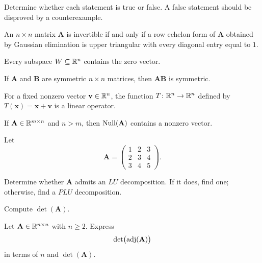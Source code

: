 \documentclass[11pt,oneside]{article}
\begin{document}
\begin{problem}
Determine whether each statement is true or false. A false statement should be disproved by a counterexample.
\begin{problemchoices}
\item An $n\times n$ matrix $\mathbf A$ is invertible if and only if a row echelon form of $\mathbf A$ obtained by Gaussian elimination is upper triangular with every diagonal entry equal to $1$.
\item Every subspace $W\subseteq\mathbb{R}^n$ contains the zero vector.
\item If $\mathbf A$ and $\mathbf B$ are symmetric $n\times n$ matrices, then $\mathbf A\mathbf B$ is symmetric.
\item For a fixed nonzero vector $\mathbf v\in\mathbb{R}^n$, the function $T\colon\mathbb{R}^n\to\mathbb{R}^n$ defined by $T(\mathbf x)=\mathbf x+\mathbf v$ is a linear operator.
\item If $\mathbf A\in\mathbb{R}^{m\times n}$ and $n>m$, then $\operatorname{Null}(\mathbf A)$ contains a nonzero vector.
\end{problemchoices}
\end{problem}

\begin{problem}
Let
\[
\mathbf A=
\begin{pmatrix}
1&2&3\\
2&3&4\\
3&4&5
\end{pmatrix}.
\]
\begin{problemsubparts}
\item Determine whether $\mathbf A$ admits an $LU$ decomposition. If it does, find one; otherwise, find a $PLU$ decomposition.
\item Compute $\det(\mathbf A)$.
\end{problemsubparts}
\end{problem}

\begin{problem}
Let $\mathbf A\in\mathbb{R}^{n\times n}$ with $n\ge2$. Express
\[
\det\bigl(\operatorname{adj}(\mathbf A)\bigr)
\]
in terms of $n$ and $\det(\mathbf A)$.
\end{problem}
\end{document}
